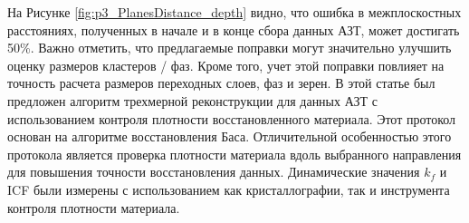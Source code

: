На Рисунке \cref{fig:p3_PlanesDistance_depth} видно, что ошибка в межплоскостных расстояниях, полученных в начале и в конце сбора данных АЗТ, может достигать 50\%. Важно отметить, что предлагаемые поправки могут значительно улучшить оценку размеров кластеров / фаз. Кроме того, учет этой поправки повлияет на точность расчета размеров переходных слоев, фаз и зерен. 
В этой статье был предложен алгоритм трехмерной реконструкции для данных АЗТ с использованием контроля плотности восстановленного материала. Этот протокол основан на алгоритме восстановления Баса. Отличительной особенностью этого протокола является проверка плотности материала вдоль выбранного направления для повышения точности восстановления данных. Динамические значения $k_f$ и ICF были измерены с использованием как кристаллографии, так и инструмента контроля плотности материала.



\clearpage
